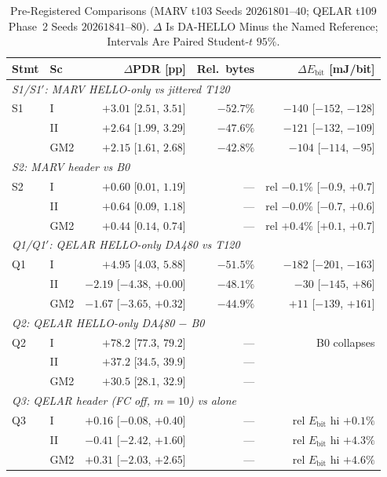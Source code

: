 \begin{table}[!t]
\caption{Pre-Registered Comparisons (MARV t103 Seeds $20261801$--$40$;
QELAR t109 Phase~2 Seeds $20261841$--$80$). $\Delta$ Is DA-HELLO Minus the
Named Reference; Intervals Are Paired Student-$t$ $95\%$.}
\label{tab:prereg}
\centering
\scriptsize
\setlength{\tabcolsep}{4pt}
\begin{tabular*}{\textwidth}{@{\extracolsep{\fill}}llrrr@{}}
\hline
Stmt & Sc & $\Delta$PDR [pp] & Rel.\ bytes & $\Delta E_{\mathrm{bit}}$ [mJ/bit] \\
\hline
\multicolumn{5}{l}{\emph{S1/S1$'$: MARV HELLO-only vs jittered T120}}\\
S1  & I   & $+3.01$ [$2.51$, $3.51$] & $-52.7\%$ & $-140$ [$-152$, $-128$] \\
    & II  & $+2.64$ [$1.99$, $3.29$] & $-47.6\%$ & $-121$ [$-132$, $-109$] \\
    & GM2 & $+2.15$ [$1.61$, $2.68$] & $-42.8\%$ & $-104$ [$-114$, $-95$] \\
\hline
\multicolumn{5}{l}{\emph{S2: MARV header vs B0}}\\
S2  & I   & $+0.60$ [$0.01$, $1.19$] & --- & rel $-0.1\%$ [$-0.9$, $+0.7$] \\
    & II  & $+0.64$ [$0.09$, $1.18$] & --- & rel $-0.0\%$ [$-0.7$, $+0.6$] \\
    & GM2 & $+0.44$ [$0.14$, $0.74$] & --- & rel $+0.4\%$ [$+0.1$, $+0.7$] \\
\hline
\multicolumn{5}{l}{\emph{Q1/Q1$'$: QELAR HELLO-only DA480 vs T120}}\\
Q1  & I   & $+4.95$ [$4.03$, $5.88$] & $-51.5\%$ & $-182$ [$-201$, $-163$] \\
    & II  & $-2.19$ [$-4.38$, $+0.00$] & $-48.1\%$ & $-30$ [$-145$, $+86$] \\
    & GM2 & $-1.67$ [$-3.65$, $+0.32$] & $-44.9\%$ & $+11$ [$-139$, $+161$] \\
\hline
\multicolumn{5}{l}{\emph{Q2: QELAR HELLO-only DA480 $-$ B0}}\\
Q2  & I   & $+78.2$ [$77.3$, $79.2$] & --- & B0 collapses \\
    & II  & $+37.2$ [$34.5$, $39.9$] & --- & \\
    & GM2 & $+30.5$ [$28.1$, $32.9$] & --- & \\
\hline
\multicolumn{5}{l}{\emph{Q3: QELAR header (FC off, $m{=}10$) vs alone}}\\
Q3  & I   & $+0.16$ [$-0.08$, $+0.40$] & --- & rel $E_{\mathrm{bit}}$ hi $+0.1\%$ \\
    & II  & $-0.41$ [$-2.42$, $+1.60$] & --- & rel $E_{\mathrm{bit}}$ hi $+4.3\%$ \\
    & GM2 & $+0.31$ [$-2.03$, $+2.65$] & --- & rel $E_{\mathrm{bit}}$ hi $+4.6\%$ \\
\hline
\end{tabular*}
\end{table}
